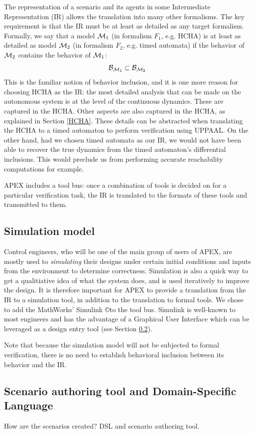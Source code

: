 The representation of a scenario and its agents in some Intermediate Representation (IR) allows the translation into many other formalisms.
The key requirement is that the IR must be at least as detailed as any target formalism.
Formally, we say that a model $\mathcal{M}_1$ (in formalism $F_1$, e.g. HCHA) is at least as detailed as model $\mathcal{M}_2$ (in formalism $F_2$, e.g. timed automata) if the behavior of $\mathcal{M}_2$ contains the behavior of $\mathcal{M}_1$: 
\[\mathcal{B}_{\mathcal{M}_1} \subset \mathcal{B}_{\mathcal{M}_2}\]
This is the familiar notion of behavior inclusion, and it is one more reason for choosing HCHA as the IR:
the most detailed analysis that can be made on the autonomous system is at the level of the continuous dynamics.
These are captured in the HCHA. 
Other aspects are also captured in the HCHA, as explained in Section \ref{HCHA}.
These details can be abstracted when translating the HCHA to a timed automaton to perform verification using UPPAAL.
On the other hand, had we chosen timed automata as our IR, we would not have been able to recover the true dynamics from the timed automaton's differential inclusions. This would preclude us from performing accurate reachability computations for example.


APEX includes a tool bus: once a combination of tools is decided on for a particular verification task, the IR is translated to the formats of these tools and transmitted to them.

\subsection{Simulation model}
\label{simulation model}
Control engineers, who will be one of the main group of users of APEX, are mostly used to \emph{simulating} their designs under certain initial conditions and inputs from the environment to determine correctness. 
Simulation is also a quick way to get a qualitiative idea of what the system does, and is used iteratively to improve the design.
It is therefore important for APEX to provide a translation from the IR to a simulation tool, in addition to the translation to formal tools. 
We chose to add the MathWorks' Simulink \copyright to the tool bus.
Simulink is well-known to most engineers and has the advantage of a Graphical User Interface which can be leveraged as a design entry tool (see Section \ref{dsl}).

Note that because the simulation model will not be subjected to formal verification, there is no need to establish behavioral inclusion between its behavior and the IR.


\subsection{Scenario authoring tool and Domain-Specific Language}
\label{dsl}
How are the scenarios created? DSL and scenario authoring tool.